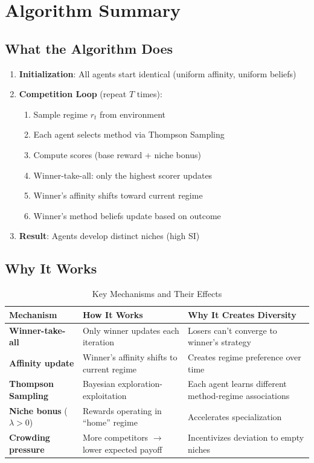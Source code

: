 \documentclass[11pt,a4paper]{article}
\theoremstyle{definition}
\theoremstyle{plain}
\begin{document}
\section{Algorithm Summary}

\subsection{What the Algorithm Does}

\begin{enumerate}
    \item \textbf{Initialization}: All agents start identical (uniform affinity, uniform beliefs)
    \item \textbf{Competition Loop} (repeat $T$ times):
    \begin{enumerate}
        \item Sample regime $r_t$ from environment
        \item Each agent selects method via Thompson Sampling
        \item Compute scores (base reward + niche bonus)
        \item Winner-take-all: only the highest scorer updates
        \item Winner's affinity shifts toward current regime
        \item Winner's method beliefs update based on outcome
    \end{enumerate}
    \item \textbf{Result}: Agents develop distinct niches (high SI)
\end{enumerate}

\subsection{Why It Works}

\begin{table}[h]
\centering
\caption{Key Mechanisms and Their Effects}
\begin{tabular}{l|p{5cm}|p{5cm}}
\toprule
Mechanism & How It Works & Why It Creates Diversity \\
\midrule
\textbf{Winner-take-all} & Only winner updates each iteration & Losers can't converge to winner's strategy \\
\textbf{Affinity update} & Winner's affinity shifts to current regime & Creates regime preference over time \\
\textbf{Thompson Sampling} & Bayesian exploration-exploitation & Each agent learns different method-regime associations \\
\textbf{Niche bonus} ($\lambda > 0$) & Rewards operating in ``home'' regime & Accelerates specialization \\
\textbf{Crowding pressure} & More competitors $\rightarrow$ lower expected payoff & Incentivizes deviation to empty niches \\
\bottomrule
\end{tabular}
\end{table}
\end{document}
